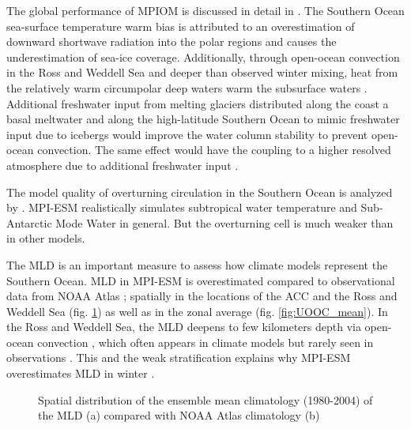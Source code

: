 

The global performance of \acs{MPIOM} is discussed in detail in \cite{Jungclaus2013}. The Southern Ocean sea-surface temperature warm bias is attributed to an overestimation of downward shortwave radiation into the polar regions \citep{Stevens2013} and causes the underestimation of sea-ice coverage. Additionally, through open-ocean convection in the Ross and Weddell Sea and deeper than observed winter mixing, heat from the relatively warm circumpolar deep waters warm the subsurface waters \citep{Stoessel2015}. Additional freshwater input from melting glaciers distributed along the coast a basal meltwater and along the high-latitude Southern Ocean to mimic freshwater input due to icebergs would improve the water column stability to prevent open-ocean convection. The same effect would have the coupling to a higher resolved atmosphere due to additional freshwater input \citep{Stoessel2015}. 

The model quality of overturning circulation in the Southern Ocean is analyzed by \cite{Sallee2013a}. \acs{MPI-ESM} realistically simulates subtropical water temperature and Sub-Antarctic Mode Water in general. But the overturning cell is much weaker than in other models.

The \ac{MLD} is an important measure to assess how climate models represent the Southern Ocean. \acs{MLD} in \acs{MPI-ESM} is overestimated compared to observational data from \acs{NOAA} Atlas \citep{Monterey1997}; spatially in the locations of the \ac{ACC} and the Ross and Weddell Sea (fig. \ref{fig:SO_comp_zmld}) as well as in the zonal average (fig. \ref{fig:UOOC_mean}). In the Ross and Weddell Sea, the \acs{MLD} deepens to few kilometers depth via open-ocean convection \citep{Stoessel2015}, which often appears in climate models but rarely seen in observations \citep{Heuze2013,deLavergne2014}. This and the weak stratification explains why \acs{MPI-ESM} overestimates \acs{MLD} in winter \citep{Sallee2013}.


\begin{figure}[h!]
	\centering
	\caption{Spatial distribution of the ensemble mean climatology (1980-2004) of the \ac{MLD} (a) compared with \acs{NOAA} Atlas climatology \cite{Monterey1997} (b)}
	\label{fig:SO_comp_zmld}
\end{figure}

